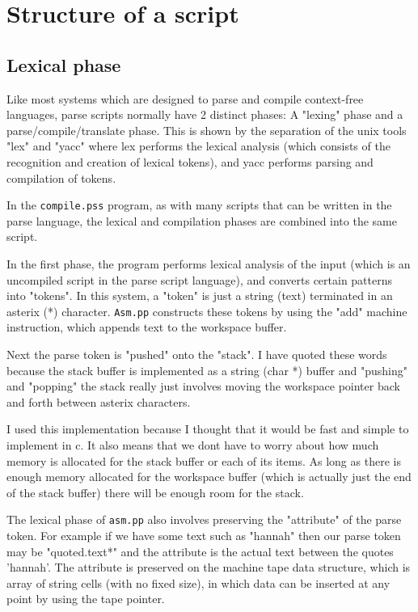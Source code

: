 \documentclass[a4paper,12pt]{article}
\begin{document}
\section{Structure of a script}

\subsection{Lexical phase}

  Like most systems which are designed to parse and compile context-free
  languages, parse scripts normally have 2 distinct phases: A "lexing" phase
  and a parse/compile/translate phase. This is shown by the separation of the
  unix tools "lex" and "yacc" where lex performs the lexical analysis (which
  consists of the recognition and creation of lexical tokens), and yacc
  performs parsing and compilation of tokens.
   
  In the \texttt{compile.pss} program, as with many scripts that can be written
  in the parse language, the lexical and compilation phases are
  combined into the same script.

  In the first phase, the program performs lexical analysis of the input
  (which is an uncompiled script in the parse script language), and converts
  certain patterns into "tokens". In this system, a "token" is just a string
  (text) terminated in an asterix (*) character. \texttt{Asm.pp} constructs these
  tokens by using the "add" machine instruction, which appends text to the
  workspace buffer.

  Next the parse token is "pushed" onto the "stack". I have quoted these
  words because the stack buffer is implemented as a string (char *)
  buffer and "pushing" and "popping" the stack really just involves
  moving the workspace pointer back and forth between asterix characters.

  I used this implementation because I thought that it would be
  fast and simple to implement in c. It also means that we dont have to
  worry about how much memory is allocated for the stack buffer or
  each of its items. As long as there is enough memory allocated for
  the workspace buffer (which is actually just the end of the stack buffer)
  there will be enough room for the stack.

  The lexical phase of \texttt{asm.pp} also involves preserving the "attribute"
  of the parse token. For example if we have some text such as
  "hannah" then our parse token may be "quoted.text*"
  and the attribute is the actual text between the quotes 'hannah'.
  The attribute is preserved on the machine tape data structure, which
  is array of string cells (with no fixed size), in which data can
  be inserted at any point by using the tape pointer.
\end{document}
